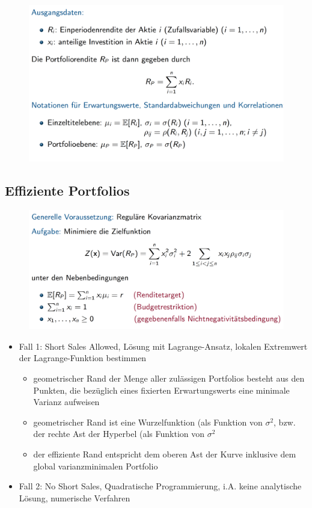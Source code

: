 \documentclass[12pt]{report}
\theoremstyle{dotless}
\theoremstyle{definition}
\begin{document}
\begin{figure}[H]
\centering
\includegraphics[width=\textwidth]{Bilder/Ausgangsdaten.png}
\end{figure}

\subsection{Effiziente Portfolios}

\begin{figure}[H]
\centering
\includegraphics[width=\textwidth]{Bilder/Minimierungsproblem.png}
\end{figure}

\begin{itemize}
	\item Fall 1: Short Sales Allowed, L\"osung mit Lagrange-Ansatz, lokalen Extremwert der Lagrange-Funktion bestimmen
	\begin{itemize}
		\item geometrischer Rand der Menge aller zul\"assigen Portfolios besteht aus den Punkten, die bez\"uglich eines fixierten Erwartungswerts eine minimale Varianz aufweisen
		\item geometrischer Rand ist eine Wurzelfunktion (als Funktion von $\sigma^2$, bzw. der rechte Ast der Hyperbel (als Funktion von $\sigma^2$
		\item der effiziente Rand entspricht dem oberen Ast der Kurve inklusive dem global varianzminimalen Portfolio
	\end{itemize}
	\item Fall 2: No Short Sales, Quadratische Programmierung, i.A. keine analytische L\"osung, numerische Verfahren
\end{itemize}
\end{document}
